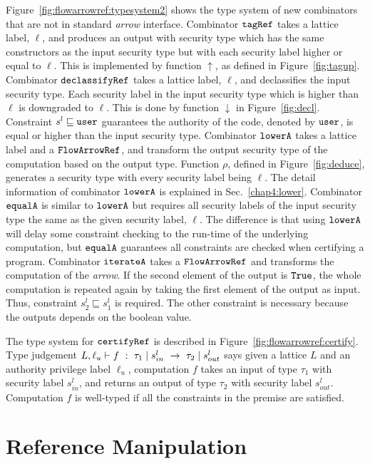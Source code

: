 \documentclass{report}
\newcommand{\co}[1]{$\cod{#1}$}
\newcommand{\sts}[1]{s_{#1}^l}
\newcommand{\st}{s^l}
\newcommand{\tagup}{\uparrow}
\newcommand{\decl}{\downarrow}
\newcommand{\typn}[1]{\tau_{#1}}
\newcommand{\res}[2]{{#1}\mid {#2}}
\begin{document}
Figure~\ref{fig:flowarrowref:typesystem2} shows the type system of new combinators that are not
in standard {\em arrow} interface. Combinator \co{tagRef} takes a lattice label, $\ell$, and produces an output
with security type which has the same constructors as the input security type but with each security label
higher or equal to $\ell$. This is implemented by function $\tagup$, as defined in Figure~\ref{fig:tagup}.
Combinator \co{declassifyRef} takes a lattice label, $\ell$, and declassifies the input security type. 
Each security label in the input security type which is higher than $\ell$ is downgraded to $\ell$.
This is done by function $\decl$ in Figure~\ref{fig:decl}. Constraint $\st\sqsubseteq \cod{user}$
guarantees the authority of the code, denoted by \co{user}, is equal or higher than the input
security type. 
Combinator \co{lowerA} takes a lattice label
and a \co{FlowArrowRef}, and transform the output security type of the computation based on the output
type. Function $\rho$, defined in Figure~\ref{fig:deduce}, generates a security type with every
security label being $\ell$. 
The detail information of combinator \co{lowerA} is explained in Sec.~\ref{chap4:lower}.
Combinator \co{equalA} is similar to \co{lowerA} but requires all security labels of the input security
type the same as the given security label, $\ell$. The difference is that using \co{lowerA} will delay
some constraint checking to the run-time of the underlying computation, but \co{equalA} guarantees
all constraints are checked when certifying a program.
Combinator \co{iterateA} takes a \co{FlowArrowRef} and transforms the computation of the {\em arrow}.
If the second element of the output is \co{True}, the whole computation is repeated again by taking
the first element of the output as input. Thus, constraint $\sts{2}\sqsubseteq \sts{1}$ is required.
The other constraint is necessary because the outputs depends on the boolean value.

The type system for \co{certifyRef} is described in Figure~\ref{fig:flowarrowref:certify}. Type judgement
$L,\ell_u\proves f~:~\res{\typn{1}}{\sts{in}}~->~\res{\typn{2}}{\sts{out}}$ says given a lattice $L$ and 
an authority privilege label $\ell_u$, computation $f$ takes an input of type $\typn{1}$ with security 
label $\sts{in}$, and returns an output of type $\typn{2}$ with security label $\sts{out}$.
Computation $f$ is well-typed if all the constraints in the premise are satisfied.


\clearpage
\section{Reference Manipulation}
\label{chap4:reference}
\end{document}
